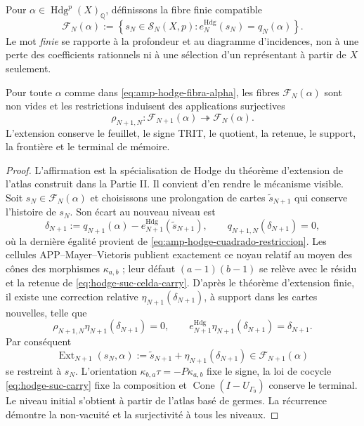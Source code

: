 Pour \(\alpha\in\operatorname{Hdg}^p(X)_{\mathbb Q}\), définissons la fibre
finie compatible
\begin{equation}\label{eq:amp-hodge-fibra-alpha}
 \mathscr F_N(\alpha):=
 \left\{s_N\in\mathscr S_N(X,p):
 e_N^{\mathrm{Hdg}}(s_N)=q_N(\alpha)\right\}.
\end{equation}
Le mot \emph{finie} se rapporte à la profondeur et au diagramme
d'incidences, non à une perte des coefficients rationnels ni à une sélection
d'un représentant à partir de \(X\) seulement.

\begin{proposition}
\label{prop:amp-hodge-extension-finita}
Pour toute \(\alpha\) comme dans \eqref{eq:amp-hodge-fibra-alpha}, les fibres
\(\mathscr F_N(\alpha)\) sont non vides et les restrictions induisent des applications
surjectives
\begin{equation}\label{eq:amp-hodge-mittag-leffler}
 \rho_{N+1,N}:\mathscr F_{N+1}(\alpha)\twoheadrightarrow
 \mathscr F_N(\alpha).
\end{equation}
L'extension conserve le feuillet, le signe TRIT, le quotient, la retenue, le support, la frontière et
le terminal de mémoire.
\end{proposition}

\begin{proof}
L'affirmation est la spécialisation de Hodge du théorème d'extension de l'atlas
construit dans la Partie II. Il convient d'en rendre le mécanisme visible. Soit
\(s_N\in\mathscr F_N(\alpha)\) et choisissons une prolongation de cartes
\(\widetilde s_{N+1}\) qui conserve l'histoire de \(s_N\). Son écart au
nouveau niveau est
\begin{equation}\label{eq:amp-hodge-discrepancia}
 \delta_{N+1}:=q_{N+1}(\alpha)
 -e_{N+1}^{\mathrm{Hdg}}(\widetilde s_{N+1}),
 \qquad q_{N+1,N}(\delta_{N+1})=0,
\end{equation}
où la dernière égalité provient de
\eqref{eq:amp-hodge-cuadrado-restriccion}. Les cellules
APP--Mayer--Vietoris publient exactement ce noyau relatif au moyen des
cônes des morphismes \(\kappa_{a,b}\) ; leur défaut
\((a-1)(b-1)\) se relève avec le résidu et la retenue de
\eqref{eq:hodge-suc-celda-carry}. D'après le théorème d'extension finie, il existe une
correction relative \(\eta_{N+1}(\delta_{N+1})\), à support dans les cartes
nouvelles, telle que
\begin{equation}\label{eq:amp-hodge-extension-operativa}
 \rho_{N+1,N}\eta_{N+1}(\delta_{N+1})=0,
 \qquad
 e_{N+1}^{\mathrm{Hdg}}\eta_{N+1}(\delta_{N+1})=\delta_{N+1}.
\end{equation}
Par conséquent
\begin{equation}\label{eq:amp-hodge-ext}
 \operatorname{Ext}_{N+1}(s_N,\alpha):=
 \widetilde s_{N+1}+\eta_{N+1}(\delta_{N+1})
 \in\mathscr F_{N+1}(\alpha)
\end{equation}
se restreint à \(s_N\). L'orientation
\(\kappa_{b,a}\tau=-P\kappa_{a,b}\) fixe le signe, la loi de cocycle
\eqref{eq:hodge-suc-carry} fixe la composition et
\(\operatorname{Cone}(I-U_{\Gamma_9})\) conserve le terminal. Le niveau initial
s'obtient à partir de l'atlas basé de germes. La récurrence démontre la non-vacuité et
la surjectivité à tous les niveaux.
\end{proof}

